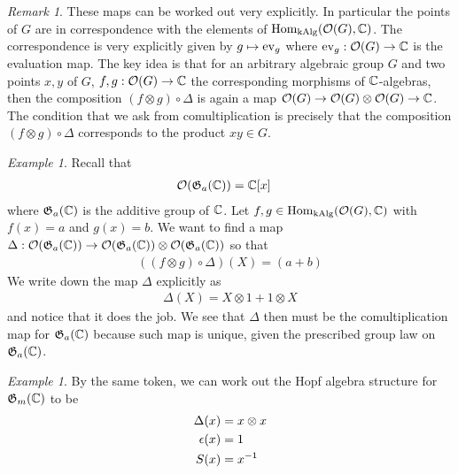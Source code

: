 \documentclass{amsart}
\numberwithin{equation}{section}
\theoremstyle{plain} %
\theoremstyle{definition}
\theoremstyle{remark}
\newtheorem{remark}[equation]{Remark}
\newtheorem{example}[equation]{Example}
\begin{document}
\begin{remark}
    These maps can be worked out very explicitly. In particular the points of $G$ are in correspondence with the elements of $\operatorname{Hom}_{\operatorname{kAlg}}({\mathcal{O}}(G),\mathbb{C})$.
    The correspondence is very explicitly given by $g\mapsto \operatorname{ev}_g$ where $\operatorname{ev}_g: {\mathcal{O}}(G)\to \mathbb{C}$ is the evaluation map. 
    The key idea is that for an arbitrary algebraic group $G$ and two points $x,y$ of $G$,
     $f,g: {\mathcal{O}}(G)\to \mathbb{C}$ the corresponding morphisms of $\mathbb{C}$-algebras, then the composition $(f\otimes g)\circ \Delta$ is again a map ${\mathcal{O}}(G)\to {\mathcal{O}}(G)\otimes {\mathcal{O}}(G)\to \mathbb{C}$.
    The condition that we ask from comultiplication is precisely that the composition $(f\otimes g)\circ \Delta$
    corresponds to the product $xy\in G$.
\end{remark}

\begin{example}
Recall that
    \begin{align*}
        {\mathcal{O}}(\mathfrak{G}_a(\mathbb{C})) &= \mathbb{C}[x]
    \end{align*} where $\mathfrak{G}_a(\mathbb{C})$ is the additive group of $\mathbb{C}$. 
    Let $f,g\in \operatorname{Hom}_{\operatorname{kAlg}}({\mathcal{O}}(G),\mathbb{C})$ with $f(x) = a$ and $g(x) = b$. 
    We want to find a map $\Delta: {\mathcal{O}}(\mathfrak{G}_a(\mathbb{C}))\to {\mathcal{O}}(\mathfrak{G}_a(\mathbb{C}))\otimes {\mathcal{O}}(\mathfrak{G}_a(\mathbb{C}))$ so that
    \begin{align*}
        ((f\otimes g)\circ \Delta)(X) = (a+b)
    \end{align*}
    We write down the map $\Delta$ explicitly as
    \begin{align*}
        \Delta(X) = X\otimes 1 + 1\otimes X
    \end{align*} and notice that it does the job. We see that $\Delta$ then must be the 
    comultiplication map for $\mathfrak{G}_a(\mathbb{C})$ because such map is unique, given the prescribed group law on $\mathfrak{G}_a(\mathbb{C})$.
\end{example}

\begin{example}
    By the same token, we can work out the Hopf algebra structure for $\mathfrak{G}_m(\mathbb{C})$ to be
    \begin{align*}
        \Delta(x) &= x\otimes x \\
        \epsilon(x) &= 1 \\
        S(x) &= {x}^{-1}
    \end{align*}
\end{example}
\end{document}
